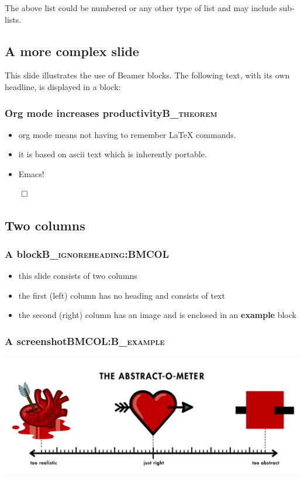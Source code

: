\documentclass[bigger]{beamer}
\begin{document}
The above list could be numbered or any other type of list and may
include sub-lists.

\subsection{A more complex slide}
\label{sec:orgf87c157}
This slide illustrates the use of Beamer blocks.  The following text,
with its own headline, is displayed in a block:
\subsubsection{Org mode increases productivity\hfill{}\textsc{B\_theorem}}
\label{sec:org0fa1d1a}
\begin{itemize}
\item org mode means not having to remember \LaTeX{} commands.
\item it is based on ascii text which is inherently portable.
\item Emacs!
\end{itemize}

\hfill \(\qed\)

\subsection{Two columns}
\label{sec:org9c36a99}

\subsubsection{A block\hfill{}\textsc{B\_ignoreheading:BMCOL}}
\label{sec:orgd060934}
\begin{itemize}
\item this slide consists of two columns
\item the first (left) column has no heading and consists of text
\item the second (right) column has an image and is enclosed in an
\textbf{example} block
\end{itemize}

\subsubsection{A screenshot\hfill{}\textsc{BMCOL:B\_example}}
\label{sec:org778000b}
\begin{center}
\includegraphics[width=.9\linewidth]{./screenshots/abstract-o-meter.png}
\end{center}
\end{document}

